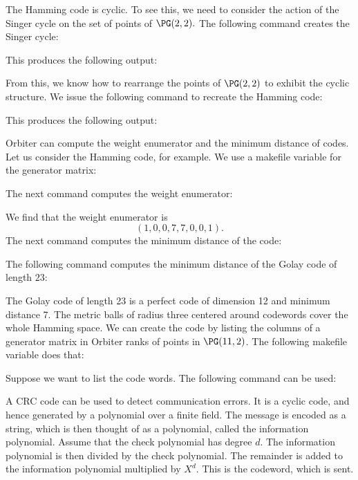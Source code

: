 \bigskip



The Hamming code is cyclic. 
To see this, we need to consider the action of the Singer cycle on
the set of points of $\PG(2,2).$
The following command creates the Singer cycle:
{\tt

}
This produces the following output:
\begin{mdframed}[style=MyFrame]

\end{mdframed}
From this, we know how to rearrange the points 
of $\PG(2,2)$ to exhibit the cyclic structure.
We issue the following command to recreate the Hamming code:
{\tt

}
{\tt

}
This produces the following output:
\begin{mdframed}[style=MyFrame]

\end{mdframed}

\bigskip

Orbiter can compute the weight enumerator and the minimum distance of codes.
Let us consider the Hamming code, for example.
We use a makefile variable for the generator matrix: 
{\tt

}
The next command computes the weight enumerator:
{\tt

}
We find that the weight enumerator is
$$
( 1, 0, 0, 7, 7, 0, 0, 1 ).
$$
The next command computes the minimum distance of the code:
{\tt

}
The following command computes the minimum distance 
of the Golay code of length $23$:
{\tt

}


The Golay code of length 23 is a perfect code of dimension 12 and minimum distance 7.
The metric balls of radius three centered around codewords cover the whole Hamming space.
We can create the code by listing the columns of a generator matrix in Orbiter ranks of points in $\PG(11,2)$.
The following makefile variable does that:
{\tt

}
Suppose we want to list the code words. The following command can be used:
{\tt

}

A CRC code can be used to detect communication errors. 
It is a cyclic code, and hence generated by a polynomial over a finite field. 
The message is encoded as a string, which is then thought of as a polynomial, 
called the information polynomial. 
Assume that the check polynomial has degree $d$.
The information polynomial is then divided by the check polynomial. 
The remainder is added to the information polynomial multiplied by $X^d.$
This is the codeword, which is sent.

